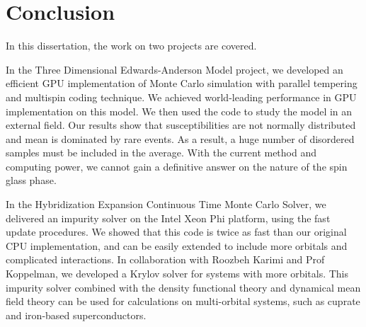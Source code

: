\chapter{Conclusion}
In this dissertation, the work on two projects are covered.

In the Three Dimensional Edwards-Anderson Model project, we developed an efficient
GPU implementation of Monte Carlo simulation with parallel tempering and
multispin coding technique. We achieved world-leading performance in GPU 
implementation on this model. We then used the code to study the model in an 
external field. Our results show that susceptibilities are not normally distributed and mean is 
dominated by rare events. As a result, a huge number of disordered samples must 
be included in the average. With the current method and computing power, we
cannot gain a definitive answer on the nature of the spin glass phase. 

In the Hybridization Expansion Continuous Time Monte Carlo Solver, we delivered
an impurity solver on the Intel Xeon Phi platform, using the fast update procedures.
We showed that this code is twice as fast than our original CPU implementation, 
and can be easily extended to include more orbitals and complicated interactions.
In collaboration with Roozbeh Karimi and Prof Koppelman, we developed a Krylov 
solver for systems with more orbitals. This impurity solver combined with the 
density functional theory and dynamical mean field theory can be used for
calculations on multi-orbital systems, such as cuprate and iron-based superconductors. 



